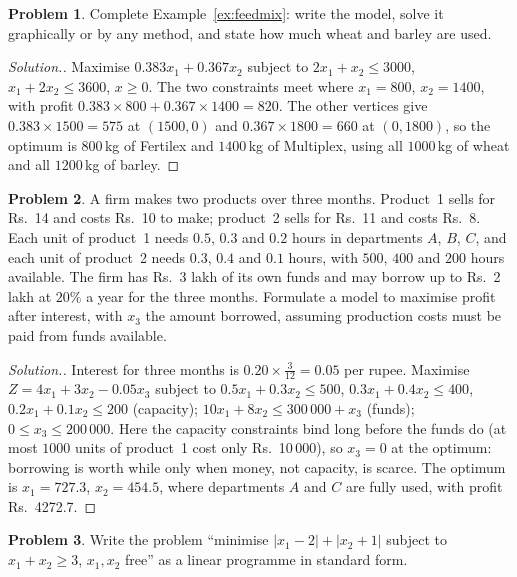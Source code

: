 \documentclass[11pt,a4paper]{article}
\numberwithin{equation}{section}
\theoremstyle{definition}
\newtheorem{problemx}{Problem}[subsection]
\newenvironment{problem}{\begin{problemx}}{\end{problemx}}
\newenvironment{solution}
  {\renewcommand{\qedsymbol}{}\begin{proof}[\textit{Solution}.]}
  {\end{proof}}
\begin{document}
\begin{problem}
Complete Example~\ref{ex:feedmix}: write the model, solve it graphically or by any method, and state how much wheat and barley are used.
\end{problem}

\begin{solution}
Maximise $0.383x_1 + 0.367x_2$ subject to $2x_1 + x_2 \leq 3000$, $x_1 + 2x_2 \leq 3600$, $x \geq 0$. The two constraints meet where $x_1 = 800$, $x_2 = 1400$, with profit $0.383 \times 800 + 0.367 \times 1400 = 820$. The other vertices give $0.383 \times 1500 = 575$ at $(1500, 0)$ and $0.367 \times 1800 = 660$ at
$(0, 1800)$, so the optimum is $800$\,kg of Fertilex and $1400$\,kg of Multiplex, using all $1000$\,kg of wheat and all $1200$\,kg of barley.
\end{solution}

\begin{problem}
A firm makes two products over three months. Product~1 sells for Rs.~14 and costs Rs.~10 to make; product~2 sells for Rs.~11 and costs Rs.~8. Each unit of product~1 needs $0.5$, $0.3$ and $0.2$ hours in departments $A$, $B$, $C$, and each unit of product~2 needs $0.3$, $0.4$ and $0.1$ hours, with $500$, $400$ and
$200$ hours available. The firm has Rs.~3 lakh of its own funds and may borrow up to Rs.~2 lakh at $20\%$ a year for the three months. Formulate a model to maximise profit after interest, with $x_3$ the amount borrowed, assuming production costs must be paid from funds available.
\end{problem}

\begin{solution}
Interest for three months is $0.20 \times \frac3{12} = 0.05$ per rupee. Maximise $Z = 4x_1 + 3x_2 - 0.05x_3$ subject to $0.5x_1 + 0.3x_2 \leq 500$, $0.3x_1 + 0.4x_2 \leq 400$, $0.2x_1 + 0.1x_2 \leq 200$ (capacity); $10x_1 + 8x_2 \leq 300\,000 + x_3$ (funds); $0 \leq x_3 \leq 200\,000$. Here the
capacity constraints bind long before the funds do (at most $1000$ units of product~1 cost only Rs.~10\,000), so $x_3 = 0$ at the optimum: borrowing is worth while only when money, not capacity, is scarce. The optimum is $x_1 = 727.3$, $x_2 = 454.5$, where departments $A$ and $C$ are fully used, with profit Rs.~4272.7.
\end{solution}

\begin{problem}
Write the problem ``minimise $|x_1 - 2| + |x_2 + 1|$ subject to $x_1 + x_2 \geq 3$, $x_1, x_2$ free'' as a linear programme in standard form.
\end{problem}
\end{document}
